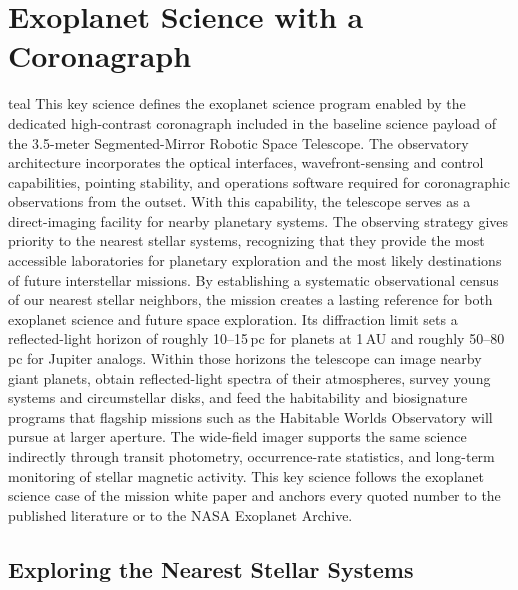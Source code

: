 \chapter{Exoplanet Science with a Coronagraph}\label{app:exoplanets}

\vspace{8mm}
\begin{leadbox}[title=Summary]{teal}
This key science defines the exoplanet science program enabled by the dedicated high-contrast coronagraph included in the baseline science payload of the 3.5-meter Segmented-Mirror Robotic Space Telescope. The observatory architecture incorporates the optical interfaces, wavefront-sensing and control capabilities, pointing stability, and operations software required for coronagraphic observations from the outset. With this capability, the telescope serves as a direct-imaging facility for nearby planetary systems.
The observing strategy gives priority to the nearest stellar systems, recognizing that they provide the most accessible laboratories for planetary exploration and the most likely destinations of future interstellar missions. 
By establishing a systematic observational census of our nearest stellar neighbors, the mission creates a lasting reference for both exoplanet science and future space exploration.
Its diffraction limit sets a reflected-light horizon of roughly 10--15\,pc for planets at 1\,AU and roughly 50--80\,pc for Jupiter analogs. Within those horizons the
telescope can image nearby giant planets, obtain reflected-light spectra
of their atmospheres, survey young systems and circumstellar disks, and
feed the habitability and biosignature programs that flagship missions
such as the Habitable Worlds Observatory will pursue at larger aperture.
The wide-field imager supports the same science indirectly through
transit photometry, occurrence-rate statistics, and long-term monitoring
of stellar magnetic activity. This key science follows the exoplanet
science case of the mission white paper and anchors every quoted number
to the published literature or to the NASA Exoplanet Archive.
\end{leadbox}
\vspace{8mm}

\section{Exploring the Nearest Stellar Systems}
\label{sec:Nearest_system}

